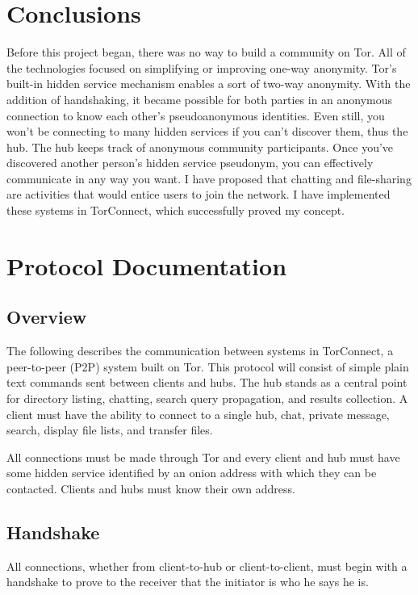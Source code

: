 \documentclass{article}
\begin{document}
\section{Conclusions}
Before this project began, there was no way to build a community on Tor.  All of the technologies focused on simplifying or improving one-way anonymity.  Tor's built-in hidden service mechanism enables a sort of two-way anonymity.  With the addition of handshaking, it became possible for both parties in an anonymous connection to know each other's pseudoanonymous identities.  Even still, you won't be connecting to many hidden services if you can't discover them, thus the hub.  The hub keeps track of anonymous community participants.  Once you've discovered another person's hidden service pseudonym, you can effectively communicate in any way you want.  I have proposed that chatting and file-sharing are activities that would entice users to join the network.  I have implemented these systems in TorConnect, which successfully proved my concept.




\appendix
\newpage
\section{Protocol Documentation}
\label{app:protocol}
\subsection{Overview}
The following describes the communication between systems in TorConnect, a peer-to-peer (P2P) system built on Tor.  This protocol will consist of simple plain text commands sent between clients and hubs.  The hub stands as a central point for directory listing, chatting, search query propagation, and results collection.  A client must have the ability to connect to a single hub, chat, private message, search, display file lists, and transfer files.

All connections must be made through Tor and every client and hub must have some hidden service identified by an onion address with which they can be contacted.  Clients and hubs must know their own address.

\subsection{Handshake}
All connections, whether from client-to-hub or client-to-client, must begin with a handshake to prove to the receiver that the initiator is who he says he is.
\end{document}
